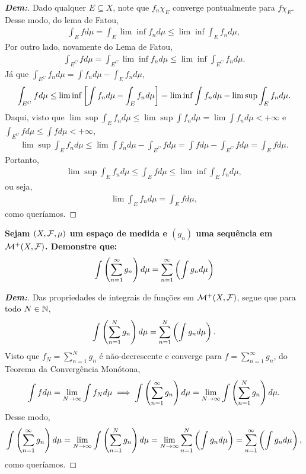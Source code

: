 \begin{proof}[\textbf{Dem:}]Dado qualquer $E \subseteq X$, note que $f_n \chi_E$
  converge pontualmente para $f \chi_E$. Desse modo, do lema de Fatou, 
\begin{align*}
  \int_E f d\mu = \int_E \lim\inf f_n d\mu \le \lim\inf \int_E f_n d\mu,
\end{align*}
Por outro lado, novamente do Lema de Fatou, 
\begin{align*}
  \int_{E^C} f d\mu = \int_{E^C} \lim \inf f_n d\mu \le \lim \inf \int_{E^C} f_n d\mu. 
\end{align*}
  Já que $\int_{E^C} f_n d\mu = \int f_n d\mu - \int_{E} f_n d\mu$, 
\begin{align*}
  \int_{E^C} fd\mu \le \lim\inf \left[\int f_n d\mu - \int_{E} f_n d\mu\right] =
  \lim\inf \int f_n d\mu - \lim\sup \int_E f_n d\mu.
\end{align*}
Daqui, visto que $\lim\sup \int_E f_n d\mu \le \lim\sup \int f_n d\mu = 
  \lim \int f_n d\mu < +\infty$ e 
  $\int_{E^C} f d\mu \le \int f d\mu < +\infty$, 
\begin{align*}
  \lim\sup \int_E f_n d\mu \le \lim \int f_n d\mu - \int_{E^C} f d\mu 
  = \int f d\mu - \int_{E^C} fd\mu = \int_E f d\mu.
\end{align*}
Portanto, 
\begin{align*}
  \lim\sup \int_E f_n d\mu \le \int_E f d\mu \le \lim \inf \int_E f_n d\mu,
\end{align*}
ou seja, 
\begin{align*}
  \lim \int_E f_n d\mu = \int_E f d\mu,
\end{align*}
como queríamos.
\end{proof}

\biglinend 
\newpage
{}
\myexe{\thetres}
\bigline
\textbf{Sejam $(X, \mathcal F, \mu)$ um espaço de medida e $(g_n)$ uma sequência em 
$\mathcal M^+(X, \mathcal F)$. Demonstre que: 
\begin{align*}
  \int\left(\sum_{n=1}^\infty g_n\right)d\mu = \sum_{n=1}^\infty\left(\int g_n d\mu\right)
\end{align*}}
\begin{proof}[\textbf{Dem:}] Das propriedades de integrais de funções
  em $\mathcal M^+(X, \mathcal F)$, segue que para todo $N \in \mathbb N$, 
\begin{align*}
  \int\left(\sum_{n=1}^N g_n\right)d\mu = \sum_{n=1}^N\left(\int g_n d\mu\right).
\end{align*}
  Visto que $f_N = \sum_{n=1}^N g_n$ é não-decrescente e 
  converge para $f = \sum_{n=1}^\infty g_n$, do Teorema da Convergência Monótona, 
\begin{align*}
  \int f d\mu = \lim_{N \rightarrow \infty} \int f_N d\mu \implies 
  \int \left(\sum_{n=1}^\infty g_n\right) d\mu = \lim_{N \rightarrow \infty} 
  \int \left(\sum_{n=1}^N g_n\right) d\mu.
\end{align*}
Desse modo, 
\begin{align*}
  \int \left(\sum_{n=1}^\infty g_n\right) d\mu = \lim_{N \rightarrow \infty} 
  \int\left(\sum_{n=1}^N g_n\right)d\mu = \lim_{N \rightarrow \infty }
  \sum_{n=1}^N\left(\int g_n d\mu\right) = \sum_{n=1}^\infty\left(\int g_n d\mu\right),
\end{align*}
como queríamos.
\end{proof}

